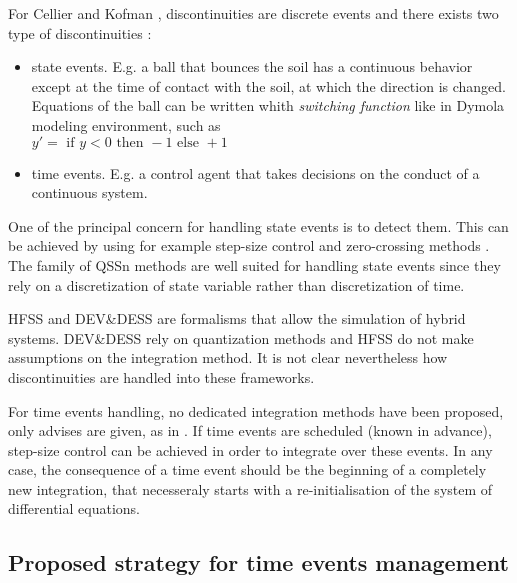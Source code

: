 \documentclass{article}
\theoremstyle{remark}
\begin{document}
For Cellier and Kofman \cite{cellier.06}, discontinuities are 
discrete events and there exists two type of discontinuities :
\begin{itemize}
  \item state events. E.g. a ball that bounces the soil
   has a continuous behavior except at the time of contact 
   with the soil, at which the direction is changed. Equations 
   of the ball can be written whith \textit{switching function} 
   like in Dymola modeling environment, such as ~\\
   $y' = \textrm{ if } y < 0 \textrm{ then } -1 \textrm{ else } +1$
   \item time events. E.g. a control agent that takes decisions 
   on the conduct of a continuous system. 
\end{itemize}

One of the principal concern for handling state events is to detect them.
This can be achieved by using for example step-size control
\cite{esposito.ACM2007} and zero-crossing methods \cite{mao.CMA02}.
The family of QSSn methods \cite{cellier.SSIM08}
are well suited for handling state events since they 
rely on a discretization of state variable rather than discretization of time.
 
HFSS \cite{barros.ACM03} and DEV\&DESS \cite{zeigler.IMS06}
are formalisms that allow the simulation of hybrid systems.
DEV\&DESS rely on quantization methods and HFSS do not make assumptions 
on the integration method. It is not clear nevertheless how
 discontinuities are handled into these frameworks.  
 
For time events handling, no dedicated integration methods have been proposed,
only advises are given, as in \cite{cellier.06}.
If time events are scheduled (known in advance), step-size control can be
achieved in order to integrate over these events. In any case, the consequence
of a time event should be the beginning of a completely new integration,
that necesseraly starts with a re-initialisation of the system of differential
equations.



\subsection{Proposed strategy for time events management}
\label{sec:theory:strategy}
\end{document}
